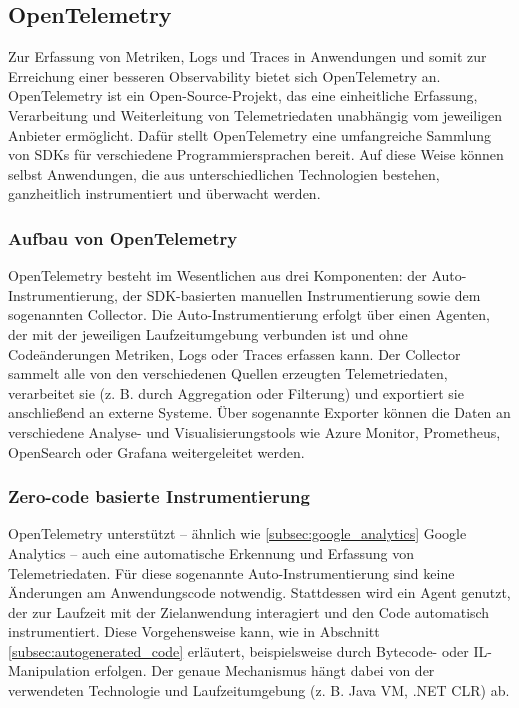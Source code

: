 \subsection{OpenTelemetry}
\label{subsec:open_telemetry}
Zur Erfassung von Metriken, Logs und Traces in Anwendungen und somit zur Erreichung einer besseren Observability bietet sich OpenTelemetry \cite{opentelemetry_what_is} an. OpenTelemetry ist ein Open-Source-Projekt, das eine einheitliche Erfassung, Verarbeitung und Weiterleitung von Telemetriedaten unabhängig vom jeweiligen Anbieter ermöglicht. Dafür stellt OpenTelemetry eine umfangreiche Sammlung von SDKs für verschiedene Programmiersprachen bereit. Auf diese Weise können selbst Anwendungen, die aus unterschiedlichen Technologien bestehen, ganzheitlich instrumentiert und überwacht werden.

\subsubsection{Aufbau von OpenTelemetry}
OpenTelemetry besteht im Wesentlichen aus drei Komponenten: der Auto-Instrumentierung, der SDK-basierten manuellen Instrumentierung sowie dem sogenannten Collector.  
Die Auto-Instrumentierung erfolgt über einen Agenten, der mit der jeweiligen Laufzeitumgebung verbunden ist und ohne Codeänderungen Metriken, Logs oder Traces erfassen kann.  
Der Collector sammelt alle von den verschiedenen Quellen erzeugten Telemetriedaten, verarbeitet sie (z. B. durch Aggregation oder Filterung) und exportiert sie anschließend an externe Systeme. Über sogenannte Exporter können die Daten an verschiedene Analyse- und Visualisierungstools wie Azure Monitor, Prometheus, OpenSearch oder Grafana weitergeleitet werden.

\subsubsection{Zero-code basierte Instrumentierung}
OpenTelemetry unterstützt – ähnlich wie \ref{subsec:google_analytics} Google Analytics – auch eine automatische Erkennung und Erfassung von Telemetriedaten. Für diese sogenannte {Auto-Instrumentierung} sind keine Änderungen am Anwendungscode notwendig. Stattdessen wird ein Agent genutzt, der zur Laufzeit mit der Zielanwendung interagiert und den Code automatisch instrumentiert. Diese Vorgehensweise kann, wie in Abschnitt \ref{subsec:autogenerated_code} erläutert, beispielsweise durch Bytecode- oder IL-Manipulation erfolgen. Der genaue Mechanismus hängt dabei von der verwendeten Technologie und Laufzeitumgebung (z. B. Java VM, .NET CLR) ab.

